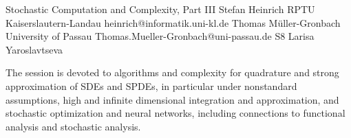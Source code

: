 

\clearpage

\begin{session}
 {Stochastic Computation and Complexity, Part III}%
 {Stefan Heinrich}%
 {RPTU Kaiserslautern-Landau}%
 {heinrich@informatik.uni-kl.de}%
 {Thomas M\"uller-Gronbach}%
 {University of Passau}%
 {Thomas.Mueller-Gronbach@uni-passau.de}%
 {S8}%
 {Larisa Yaroslavtseva}%

 The session is devoted to algorithms and complexity for
 quadrature and strong approximation of SDEs and SPDEs, in particular under nonstandard assumptions,
 high and infinite dimensional integration and approximation, and
 stochastic optimization and neural networks,
 including connections to functional analysis and stochastic analysis.
 \medskip
\end{session}



\clearpage

